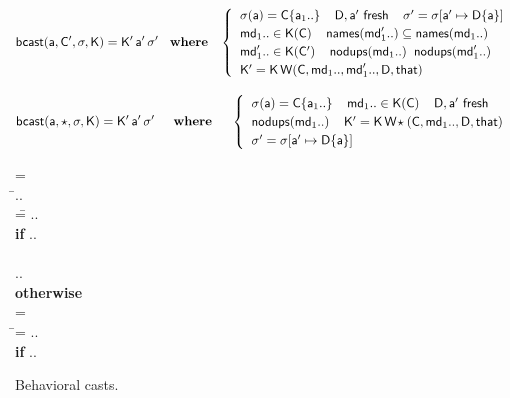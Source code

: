 \documentclass[runnningheads]{tex/llncs}
\begin{document}
\begin{figure}[!h]
\hrulefill
\small

\vspace{-4mm}

\begin{equation*}
  \behcastE\a\Cp\s\K \Kp\ap\sp \HS\WHERE\HS \begin{cases}
\HS  \App\s\a = \obj\C{\a[1]..} \HS\HS
  \fresh{\D,\ap} \HS\HS
  \sp = \Map \s{\Bind\ap{\obj\D{\a}}} \\\HS
  \md[1].. \In \App\K\C \HS\HS \names{\mdp[1]..} \subseteq \names{\md[1]..} \\\HS
  \mdp[1].. \In \App\K\Cp \HS\HS \cload{\md[1]..} \HS \cload{\mdp[1]..} \\\HS
  \Kp = \K\,\wrap\C{\md[1]..}{\mdp[1]..}\D\that 

  \end{cases}
\end{equation*}

\begin{equation*}
  \behcastE\a\any\s\K \Kp\ap\sp  \HS\HS\WHERE\HS\HS\begin{cases}\HS
  \App\s\a = \obj\C{\a[1]..} \HS\HS \md[1].. \In \App\K\C \HS\HS
  \fresh{\D,\ap} \\\HS \cload{\md[1]..} \HS\HS
  \Kp = \K\,\wrapAny\C{\md[1]..}\D\that \\\HS
  \sp = \Map \s{\Bind\ap{\obj\D{\a}}} 
\end{cases}\end{equation*}


\hrulefill
\vspace{-2mm}\caption{Behavioral casts.}\label{behavetext}

\hrulefill
\small

\begin{tabbing}\small
  \wrap{}\D\that = \\
  \HS\HS\WHERE\HS\= \Mdef\m\x{\t[1]}{\t[2]}\e\In\md[1].. \\
                 \> \mdpp[1] =\= \src{\Mdef\m\x{\tp[1]}{\tp[2]}{~\BehCast{\tp[2]}{\KCall{\FRead\that}\m{\bscast{\tp[1]}\x}{\t[1]}{\t[2]}}}} .. \\
\> \> \HS\HS \= \textbf{if} \HS \Mdef\m\x{\tp[1]}{\tp[2]}\ep\In\mdp[1].. \\
\\[-3mm]
\> \>  \src{\Mdef\m\x{\t[1]}{\t[2]}{~\KCall{\FRead\that}\m{\x}{\t[1]}{\t[2]}}} .. \\ \> \> \HS\HS \textbf{otherwise}
\\[3mm]
   = \\
\HS\HS\WHERE\HS\=\mdp[1] = \src{ \Mdef\m\x{\any}{\any}{~\BehCast\any{ \KCall{\FRead\that} \m {\bscast{\t}\x}{\t}{\tp}} } }   ..
    \HS\HS\HS\HS \\ \> \> \HS\HS \= \textbf{if} \HS \Mdef\m\x{\t}{\tp}\e\In\md[1].. \\
\end{tabbing}


\end{figure}
\end{document}
